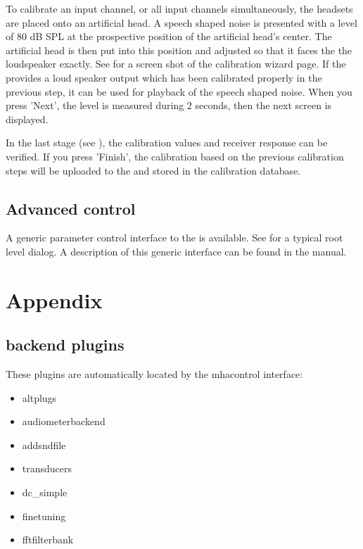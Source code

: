\documentclass[11pt,a4paper,twoside]{article}
\newcommand{\+}{\discretionary{\mbox{\scriptsize$\hookleftarrow$}}{}{}}
\begin{document}

To calibrate an input channel, or all input channels simultaneously,
the headsets are placed onto an artificial head.
A speech shaped noise is presented with a level of 80
dB SPL at the prospective position of the artificial head's center.
The artificial head is then put into this position and adjusted so that it 
faces the the loudspeaker exactly. 
%
See  for a screen shot of the
calibration wizard page.
%
If the \mha{} provides a loud speaker output which has been
calibrated properly in the previous step, it can be used for playback
of the speech shaped noise.
%
When you press 'Next', the level is measured during 2 seconds, then
the next screen is displayed.


In the last stage (see ), the
calibration values and receiver response can be verified.
%
If you press 'Finish', the calibration based on the previous
calibration steps will be uploaded to the \mha{} and stored in the
calibration database.


\subsection{Advanced control}\label{sec:advanced}

A generic parameter control interface to the \mha{} is available. See
 for a typical root level dialog.
%
A description of this generic interface can be found in the \mha{}
manual.


\section{Appendix}

\subsection{\mha{} backend plugins}

These plugins are automatically located by the mhacontrol interface:
%
\begin{itemize}
\item altplugs
\item audiometerbackend
\item addsndfile
\item transducers
\item dc\_simple
\item finetuning
\item fftfilterbank
\end{itemize}



\printindex
\end{document}
